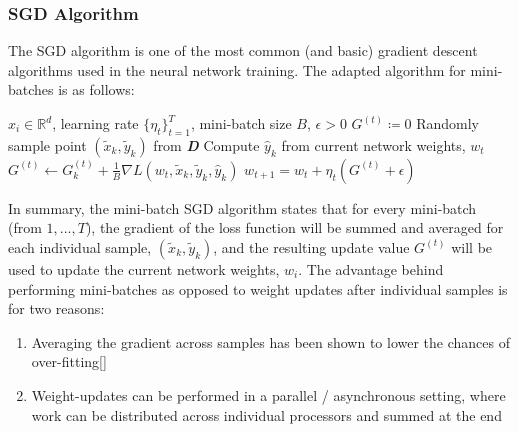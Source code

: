\subsubsection{SGD Algorithm}

The SGD algorithm is one of the most common (and basic) gradient descent algorithms used in the neural network training. The adapted algorithm for mini-batches is as follows:
\vspace{14pt}
\begin{minipage}[b]{.48\textwidth}
\begin{algorithm}[H]\small
	\caption{$Mini-batch\:SGD$ \cite{SGD}}
	\label{alg:SGD}
	\begin{algorithmic}
		 $x_i \in \mathbb{R}^d$, learning rate $\{\eta_t\}_{t=1}^T$, mini-batch size $B$, $\epsilon>0$
		\vspace{2pt}
		\vspace{2pt}
		\STATE $G^{(t)}\coloneqq 0$
		\vspace{2pt}
		    \vspace{2pt}
		    \STATE Randomly sample point $(\tilde x_k,\tilde y_k)$ from \textbf{\textit{D}}
		    \vspace{2pt}
		    \STATE Compute $\hat y_k$ from current network weights, $w_t$
		    \vspace{2pt}
		    \STATE $G^{(t)}\leftarrow G_k^{(t)} + \frac{1}{B}\nabla L(w_t,\tilde x_{k},\tilde y_k,\hat y_k)$
		    \vspace{4pt}
		\ENDFOR
		\vspace{2pt}
		\STATE $w_{t+1} = w_{t} + \eta_t (G^{(t)} + \epsilon)$
		\vspace{4pt}
		\ENDFOR
	\end{algorithmic}
\end{algorithm}
\end{minipage}\hfill
\vspace{-8pt}

In summary, the mini-batch SGD algorithm states that for every mini-batch (from $1,...,\textit{T}$), the gradient of the loss function will be summed and averaged for each individual sample, $(\tilde x_k,\tilde y_k)$, and the resulting update value $G^{(t)}$ will be used to update the current network weights, $w_i$. The advantage behind performing mini-batches as opposed to weight updates after individual samples is for two reasons:
\vspace{4pt}
\begin{enumerate}
    \item Averaging the gradient across samples has been shown to lower the chances of over-fitting[]
    \item Weight-updates can be performed in a parallel / asynchronous setting, where work can be distributed across individual processors and summed at the end
\end{enumerate}
\vspace{3pt}

